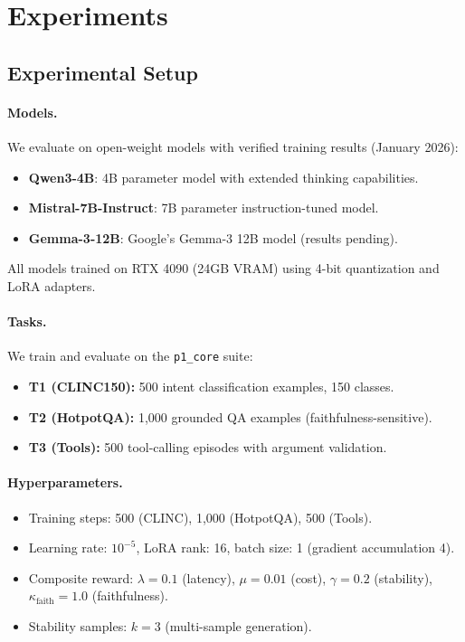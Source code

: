 \documentclass[11pt]{article}
\begin{document}
\section{Experiments}
\label{sec:experiments}

\subsection{Experimental Setup}

\paragraph{Models.}
We evaluate on open-weight models with verified training results (January 2026):
\begin{itemize}[leftmargin=12pt]
    \item \textbf{Qwen3-4B}: 4B parameter model with extended thinking capabilities.
    \item \textbf{Mistral-7B-Instruct}: 7B parameter instruction-tuned model.
    \item \textbf{Gemma-3-12B}: Google's Gemma-3 12B model (results pending).
\end{itemize}
All models trained on RTX 4090 (24GB VRAM) using 4-bit quantization and LoRA adapters.

\paragraph{Tasks.}
We train and evaluate on the \texttt{p1\_core} suite:
\begin{itemize}[leftmargin=12pt]
    \item \textbf{T1 (CLINC150):} 500 intent classification examples, 150 classes.
    \item \textbf{T2 (HotpotQA):} 1{,}000 grounded QA examples (faithfulness-sensitive).
    \item \textbf{T3 (Tools):} 500 tool-calling episodes with argument validation.
\end{itemize}

\paragraph{Hyperparameters.}
\begin{itemize}[leftmargin=12pt]
    \item Training steps: 500 (CLINC), 1{,}000 (HotpotQA), 500 (Tools).
    \item Learning rate: $10^{-5}$, LoRA rank: 16, batch size: 1 (gradient accumulation 4).
    \item Composite reward: $\lambda = 0.1$ (latency), $\mu = 0.01$ (cost), $\gamma = 0.2$ (stability), $\kappa_{\text{faith}} = 1.0$ (faithfulness).
    \item Stability samples: $k=3$ (multi-sample generation).
\end{itemize}
\end{document}
